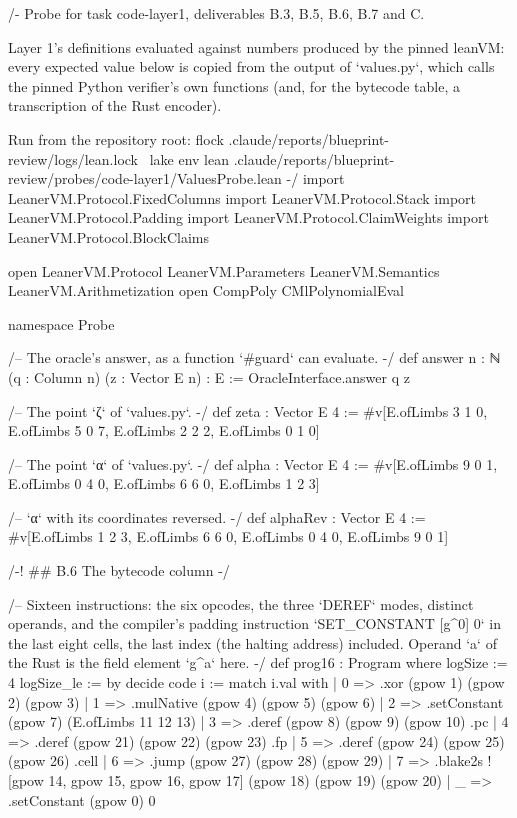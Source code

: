 \begin{leancode}
/-
  Probe for task code-layer1, deliverables B.3, B.5, B.6, B.7 and C.

  Layer 1's definitions evaluated against numbers produced by the pinned leanVM: every
  expected value below is copied from the output of `values.py`, which calls the pinned Python
  verifier's own functions (and, for the bytecode table, a transcription of the Rust encoder).

  Run from the repository root:
    flock .claude/reports/blueprint-review/logs/lean.lock \
      lake env lean .claude/reports/blueprint-review/probes/code-layer1/ValuesProbe.lean
-/
import LeanerVM.Protocol.FixedColumns
import LeanerVM.Protocol.Stack
import LeanerVM.Protocol.Padding
import LeanerVM.Protocol.ClaimWeights
import LeanerVM.Protocol.BlockClaims

open LeanerVM.Protocol LeanerVM.Parameters LeanerVM.Semantics LeanerVM.Arithmetization
open CompPoly CMlPolynomialEval

namespace Probe

/-- The oracle's answer, as a function `#guard` can evaluate. -/
def answer {n : ℕ} (q : Column n) (z : Vector E n) : E := OracleInterface.answer q z

/-- The point `ζ` of `values.py`. -/
def zeta : Vector E 4 := #v[E.ofLimbs 3 1 0, E.ofLimbs 5 0 7, E.ofLimbs 2 2 2, E.ofLimbs 0 1 0]

/-- The point `α` of `values.py`. -/
def alpha : Vector E 4 := #v[E.ofLimbs 9 0 1, E.ofLimbs 0 4 0, E.ofLimbs 6 6 0, E.ofLimbs 1 2 3]

/-- `α` with its coordinates reversed. -/
def alphaRev : Vector E 4 := #v[E.ofLimbs 1 2 3, E.ofLimbs 6 6 0, E.ofLimbs 0 4 0, E.ofLimbs 9 0 1]

/-! ## B.6 The bytecode column -/

/-- Sixteen instructions: the six opcodes, the three `DEREF` modes, distinct operands, and the
compiler's padding instruction `SET_CONSTANT [g^0] 0` in the last eight cells, the last index
(the halting address) included. Operand `a` of the Rust is the field element `g^a` here. -/
def prog16 : Program where
  logSize := 4
  logSize_le := by decide
  code i := match i.val with
    | 0 => .xor (gpow 1) (gpow 2) (gpow 3)
    | 1 => .mulNative (gpow 4) (gpow 5) (gpow 6)
    | 2 => .setConstant (gpow 7) (E.ofLimbs 11 12 13)
    | 3 => .deref (gpow 8) (gpow 9) (gpow 10) .pc
    | 4 => .deref (gpow 21) (gpow 22) (gpow 23) .fp
    | 5 => .deref (gpow 24) (gpow 25) (gpow 26) .cell
    | 6 => .jump (gpow 27) (gpow 28) (gpow 29)
    | 7 => .blake2s ![gpow 14, gpow 15, gpow 16, gpow 17] (gpow 18) (gpow 19) (gpow 20)
    | _ => .setConstant (gpow 0) 0


\end{leancode}
